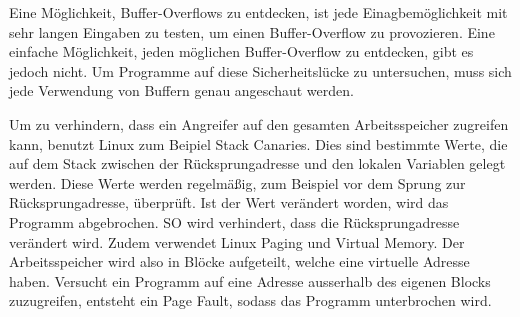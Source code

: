 \documentclass[12pt,a4paper]{article}
\begin{document}
Eine Möglichkeit, Buffer-Overflows zu entdecken, ist jede Einagbemöglichkeit mit sehr 
langen Eingaben zu testen, um einen Buffer-Overflow zu provozieren.
Eine einfache Möglichkeit, jeden möglichen Buffer-Overflow zu entdecken, gibt es jedoch nicht. 
Um Programme auf diese Sicherheitslücke zu untersuchen, muss sich jede Verwendung von Buffern 
genau angeschaut werden. 
\bigskip

Um zu verhindern, dass ein Angreifer auf den gesamten Arbeitsspeicher zugreifen kann, benutzt 
Linux zum Beipiel Stack Canaries. Dies sind bestimmte Werte, die auf dem Stack zwischen 
der Rücksprungadresse und den lokalen Variablen gelegt werden. Diese Werte werden regelmäßig, 
zum Beispiel vor dem Sprung zur Rücksprungadresse, überprüft. Ist der Wert verändert worden, 
wird das Programm abgebrochen. SO wird verhindert, dass die Rücksprungadresse verändert wird. 
Zudem verwendet Linux Paging und Virtual Memory. Der Arbeitsspeicher wird also in Blöcke 
aufgeteilt, welche eine virtuelle Adresse haben. Versucht ein Programm auf eine Adresse 
ausserhalb des eigenen Blocks zuzugreifen, entsteht ein Page Fault, sodass das Programm 
unterbrochen wird. 
\bigskip
\end{document}
